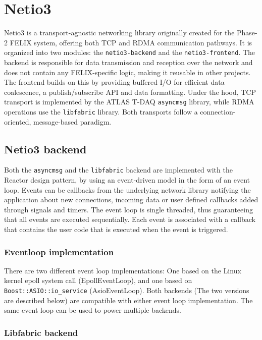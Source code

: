 \chapter{Netio3}
\label{chap:netio3}

Netio3 \cite{netio3-docs} is a transport-agnostic networking library originally created for the Phase-2 \acs{FELIX} system, offering both TCP and \acs{RDMA} communication pathways.  It is organized into two modules: the \texttt{netio3-backend} and the \texttt{netio3-frontend}.  The backend is responsible for data transmission and reception over the network and does not contain any \acs{FELIX}-specific logic, making it reusable in other projects. The frontend builds on this by providing buffered I/O for efficient data coalescence, a publish/subscribe API and data formatting.  Under the hood, TCP transport is implemented by the \acs{ATLAS} \acs{T-DAQ} \texttt{asyncmsg} \cite{asyncmsg} library, while \acs{RDMA} operations use the \texttt{libfabric} \cite{libfabric} library.  Both transports follow a connection-oriented, message-based paradigm.

\section{Netio3 backend}

Both the \texttt{asyncmsg} and the \texttt{libfabric} backend are implemented with the Reactor design pattern, by using an event-driven model in the form of an event loop. Events can be callbacks from the underlying network library notifying the application about new connections, incoming data or user defined callbacks added through signals and timers. The event loop is single threaded, thus guaranteeing that all events are executed sequentially. Each event is associated with a callback that contains the user code that is executed when the event is triggered.

\subsection{Eventloop implementation}

There are two different event loop implementations: One based on the Linux kernel epoll system call (EpollEventLoop), and one based on \texttt{Boost::ASIO::io\_service} (AsioEventLoop). Both backends (The two versions are described below) are compatible with either event loop implementation. The same event loop can be used to power multiple backends.


\subsection{Libfabric backend}
\label{subsec:libfabric}

